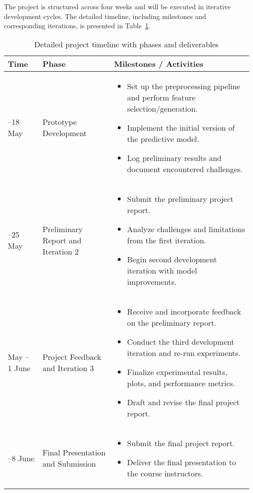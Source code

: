 \documentclass[a4paper,12pt]{article}
\begin{document}
The project is structured across four weeks and will be executed in iterative development cycles. The detailed timeline, including milestones and corresponding iterations, is presented in Table~\ref{tab:timeline}.
\begin{table}[h!]
\centering
\renewcommand{\arraystretch}{1.4}
\begin{tabular}{|>{\centering\arraybackslash}m{3.5cm}|>{\centering\arraybackslash}m{4cm}|m{7cm}|}
\hline
\textbf{Time} & \textbf{Phase} & \textbf{Milestones / Activities} \\
\hline
12--18 May & Prototype Development &
\begin{itemize}
    \item Set up the preprocessing pipeline and perform feature selection/generation.
    \item Implement the initial version of the predictive model.
    \item Log preliminary results and document encountered challenges.
\end{itemize} \\
\hline
19--25 May & Preliminary Report and Iteration 2 &
\begin{itemize}
    \item Submit the preliminary project report.
    \item Analyze challenges and limitations from the first iteration.
    \item Begin second development iteration with model improvements.
\end{itemize} \\
\hline
26 May -- 1 June & Project Feedback and Iteration 3 &
\begin{itemize}
    \item Receive and incorporate feedback on the preliminary report.
    \item Conduct the third development iteration and re-run experiments.
    \item Finalize experimental results, plots, and performance metrics.
    \item Draft and revise the final project report.
\end{itemize} \\
\hline
2--8 June & Final Presentation and Submission &
\begin{itemize}
    \item Submit the final project report.
    \item Deliver the final presentation to the course instructors.
\end{itemize} \\
\hline
\end{tabular}
\caption{Detailed project timeline with phases and deliverables}
\label{tab:timeline}
\end{table}



\end{document}
